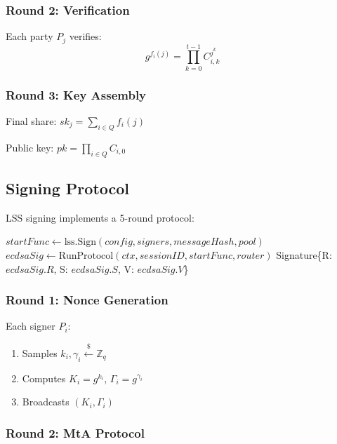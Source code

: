 \documentclass[11pt,twocolumn]{article}
\begin{document}
\subsubsection{Round 2: Verification}

Each party $P_j$ verifies:
\begin{equation}
g^{f_i(j)} = \prod_{k=0}^{t-1} C_{i,k}^{j^k}
\end{equation}

\subsubsection{Round 3: Key Assembly}

Final share: $sk_j = \sum_{i \in Q} f_i(j)$

Public key: $pk = \prod_{i \in Q} C_{i,0}$

\subsection{Signing Protocol}

LSS signing implements a 5-round protocol:

\begin{algorithm}
\caption{LSS Threshold Signing}
\label{alg:lss-sign}
\begin{algorithmic}[1]
    \State $startFunc \gets \text{lss.Sign}(config, signers, messageHash, pool)$
    \State $ecdsaSig \gets \text{RunProtocol}(ctx, sessionID, startFunc, router)$
    \State \Return Signature\{R: $ecdsaSig.R$, S: $ecdsaSig.S$, V: $ecdsaSig.V$\}
\EndProcedure
\end{algorithmic}
\end{algorithm}

\subsubsection{Round 1: Nonce Generation}

Each signer $P_i$:
\begin{enumerate}
\item Samples $k_i, \gamma_i \xleftarrow{\$} \mathbb{Z}_q$
\item Computes $K_i = g^{k_i}$, $\Gamma_i = g^{\gamma_i}$
\item Broadcasts $(K_i, \Gamma_i)$
\end{enumerate}

\subsubsection{Round 2: MtA Protocol}
\end{document}
